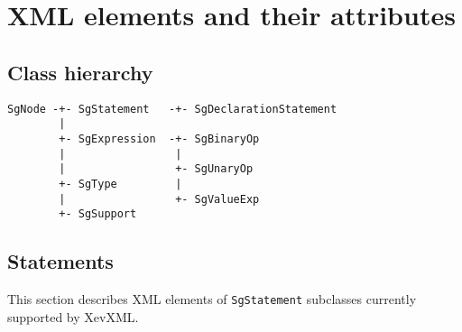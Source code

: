 \chapter{XML elements and their attributes}\label{sec:attrib}

\section{Class hierarchy}
\begin{verbatim}
SgNode -+- SgStatement   -+- SgDeclarationStatement
        |
        +- SgExpression  -+- SgBinaryOp
        |                 |
        |                 +- SgUnaryOp
        +- SgType         |
        |                 +- SgValueExp
        +- SgSupport
\end{verbatim}
\section{Statements}
This section describes XML elements of \texttt{SgStatement} subclasses
currently supported by XevXML.

